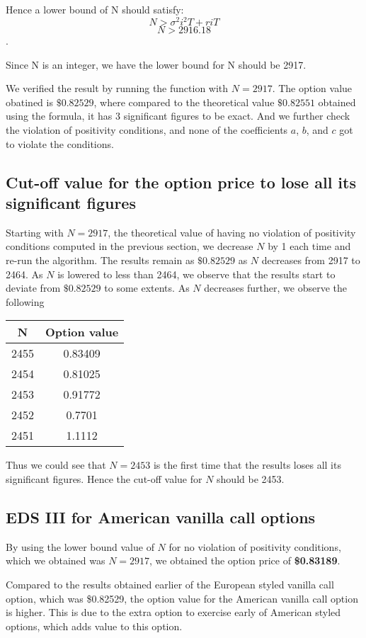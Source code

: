 Hence a lower bound of N should satisfy: $$N > \sigma^2 i^2 T + r i T$$ $$N > 2916.18$$. 

Since N is an integer, we have the lower bound for N should be 2917.

We verified the result by running the function with $N = 2917$. The option value obatined is $\$0.82529$, where compared to the theoretical value $\$0.82551$ obtained using the formula, it has 3 significant figures to be exact. And we further check the violation of positivity conditions, and none of the coefficients $a$, $b$, and $c$ got to violate the conditions.

\subsection{Cut-off value for the option price to lose all its significant figures}

Starting with $N = 2917$, the theoretical value of having no violation of positivity conditions computed in the previous section, we decrease $N$ by 1 each time and re-run the algorithm. The results remain as $\$0.82529$ as $N$ decreases from 2917 to 2464. As $N$ is lowered to less than 2464, we observe that the results start to deviate from $\$0.82529$ to some extents. As $N$ decreases further, we observe the following
\begin{center}
	\begin{tabular}{| c | c |}
		\hline N & Option value\\
		[0.5ex]
		\hline 2455 & 0.83409 \\
		\hline 2454 & 0.81025 \\
		\hline 2453 & 0.91772 \\
		\hline 2452 & 0.7701 \\
		\hline 2451 & 1.1112 \\
		\hline
	\end{tabular}
\end{center}

Thus we could see that $N = 2453$ is the first time that the results loses all its significant figures. Hence the cut-off value for $N$ should be 2453.

\subsection{EDS III for American vanilla call options}
By using the lower bound value of $N$ for no violation of positivity conditions, which we obtained was $N = 2917$, we obtained the option price of \textbf{\$0.83189}.

Compared to the results obtained earlier of the European styled vanilla call option, which was \$0.82529, the option value for the American vanilla call option is higher. This is due to the extra option to exercise early of American styled options, which adds value to this option.


